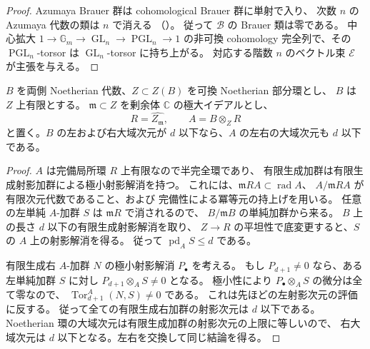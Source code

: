 \begin{proof}
Azumaya Brauer 群は cohomological Brauer 群に単射で入り、
次数 $n$ の Azumaya 代数の類は $n$ で消える
（\cite[Section~59.62, Lemma~59.62.2, Tag~0A2J]{CMOStacksNode}）。
従って $\mathcal B$ の Brauer 類は零である。
中心拡大
$1\to\mathbb G_m\to\operatorname{GL}_n\to
\operatorname{PGL}_n\to1$
の非可換 cohomology 完全列で、その
$\operatorname{PGL}_n$-torsor は $\operatorname{GL}_n$-torsor に持ち上がる。
対応する階数 $n$ のベクトル束 $\mathcal E$ が主張を与える。
\end{proof}

\begin{lemma}[完備化した有限代数の大域次元]
\label{cmo:lem:completion-global-dimension}
$B$ を両側 Noetherian 代数、$Z\subset Z(B)$ を可換 Noetherian 部分環とし、
$B$ は $Z$ 上有限とする。
$\mathfrak m\subset Z$ を剰余体 $\mathbb C$ の極大イデアルとし、
\[
 R=\widehat{Z_{\mathfrak m}},\qquad
 A=B\otimes_Z R
\]
と置く。$B$ の左および右大域次元が $d$ 以下なら、$A$ の左右の大域次元も
$d$ 以下である。
\end{lemma}
\begin{proof}
$A$ は完備局所環 $R$ 上有限なので半完全環であり、
有限生成加群は有限生成射影加群による極小射影解消を持つ。
これには、$\mathfrak m R A\subset\operatorname{rad}A$、
$A/\mathfrak m R A$ が有限次元代数であること、および
完備性による冪等元の持上げを用いる。
任意の左単純 $A$-加群 $S$ は $\mathfrak m R$ で消されるので、
$B/\mathfrak m B$ の単純加群から来る。
$B$ 上の長さ $d$ 以下の有限生成射影解消を取り、
$Z\to R$ の平坦性で底変更すると、$S$ の $A$ 上の射影解消を得る。
従って $\operatorname{pd}_A S\le d$ である。

有限生成右 $A$-加群 $N$ の極小射影解消 $P_\bullet$ を考える。
もし $P_{d+1}\ne0$ なら、ある左単純加群 $S$ に対し
$P_{d+1}\otimes_A S\ne0$ となる。
極小性により $P_\bullet\otimes_A S$ の微分は全て零なので、
$\operatorname{Tor}_{d+1}^A(N,S)\ne0$ である。
これは先ほどの左射影次元の評価に反する。
従って全ての有限生成右加群の射影次元は $d$ 以下である。
Noetherian 環の大域次元は有限生成加群の射影次元の上限に等しいので、
右大域次元は $d$ 以下となる。左右を交換して同じ結論を得る。
\end{proof}

